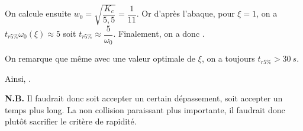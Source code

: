 \documentclass[a4paper,french,bookmarks]{article}
\begin{document}
\begin{enumerate}
{        On calcule ensuite $w_0 = \sqrt{\dfrac{K_c}{5,5}} = \dfrac{1}{11}$. Or d'après l'abaque, pour $\xi = 1$, on a $t_{r5\%}{\omega_0}(\xi) \approx 5$ soit $t_{r5\%} \approx \dfrac{5}{\omega_0}$.
        Finalement, on a donc . 
        
        On remarque que même avec une valeur optimale de $\xi$, on a toujours $t_{r5\%} > 30 \ s$. 
        
        Ainsi, .\newline\newline
        
        \textbf{N.B.} Il faudrait donc soit accepter un certain dépassement, soit accepter un temps plus long. La non collision paraissant plus importante, il faudrait donc plutôt sacrifier le critère de rapidité.
    }
    
\end{enumerate}
\end{document}
